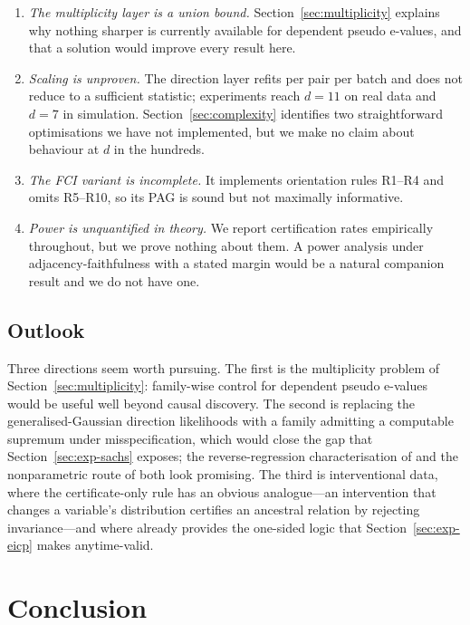 \begin{enumerate}
\item \emph{The multiplicity layer is a union bound.}
  Section~\ref{sec:multiplicity} explains why nothing sharper is currently
  available for dependent pseudo e-values, and that a solution would improve
  every result here.

\item \emph{Scaling is unproven.} The direction layer refits per pair per
  batch and does not reduce to a sufficient statistic; experiments reach
  $d = 11$ on real data and $d = 7$ in simulation. Section~\ref{sec:complexity}
  identifies two straightforward optimisations we have not implemented, but we
  make no claim about behaviour at $d$ in the hundreds.

\item \emph{The FCI variant is incomplete.} It implements orientation rules
  R1--R4 and omits R5--R10, so its PAG is sound but not maximally informative.

\item \emph{Power is unquantified in theory.} We report certification rates
  empirically throughout, but we prove nothing about them. A power analysis
  under adjacency-faithfulness with a stated margin would be a natural
  companion result and we do not have one.
\end{enumerate}

\subsection{Outlook}

Three directions seem worth pursuing. The first is the multiplicity problem of
Section~\ref{sec:multiplicity}: family-wise control for dependent pseudo
e-values would be useful well beyond causal discovery. The second is replacing
the generalised-Gaussian direction likelihoods with a family admitting a
computable supremum under misspecification, which would close the gap that
Section~\ref{sec:exp-sachs} exposes; the reverse-regression characterisation
of \citet{ding2025gaussdetect} and the nonparametric route of
\citet{he2026sequential} both look promising. The third is interventional
data, where the certificate-only rule has an obvious analogue---an
intervention that changes a variable's distribution certifies an ancestral
relation by rejecting invariance---and where \citet{peters2016causal} already
provides the one-sided logic that Section~\ref{sec:exp-eicp} makes
anytime-valid.

\section{Conclusion}\label{sec:conclusion}

